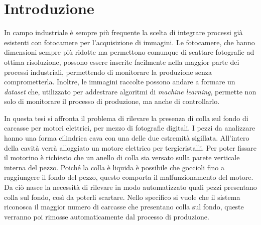 
\chapter{Introduzione}
In campo industriale è sempre più frequente la scelta di integrare processi già esistenti con fotocamere per l'acquisizione di immagini.
Le fotocamere, che hanno dimensioni sempre più ridotte ma permettono comunque di scattare fotografie ad ottima risoluzione, possono essere inserite facilmente nella maggior parte dei processi industriali, permettendo di monitorare la produzione senza comprometterla.
Inoltre, le immagini raccolte possono andare a formare un \textit{dataset} che, utilizzato per addestrare algoritmi di \textit{machine learning}, permette non solo di monitorare il processo di produzione, ma anche di controllarlo.

In questa tesi si affronta il problema di rilevare la presenza di colla sul fondo di carcasse per motori elettrici, per mezzo di fotografie digitali.
I pezzi da analizzare hanno una forma cilindrica cava con una delle due estremità sigillata.
All'intero della cavità verrà alloggiato un motore elettrico per tergicristalli.
Per poter fissare il motorino è richiesto che un anello di colla sia versato sulla parete verticale interna del pezzo.
Poiché la colla è liquida è possibile che goccioli fino a raggiungere il fondo del pezzo, questo comporta il malfunzionamento del motore.
Da ciò nasce la necessità di rilevare in modo automatizzato quali pezzi presentano colla sul fondo, così da poterli scartare.
Nello specifico si vuole che il sistema riconosca il maggior numero di carcasse che presentano colla sul fondo, queste verranno poi rimosse automaticamente dal processo di produzione.

